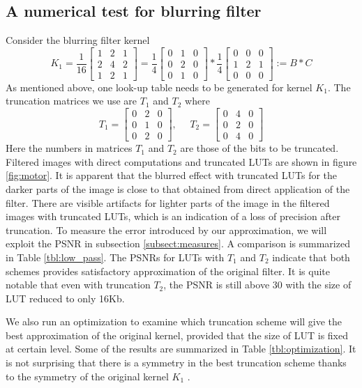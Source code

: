 \documentclass[12pt]{amsart}
\theoremstyle{definition}
\theoremstyle{remark}
\numberwithin{thm}{section}
\begin{document}
\subsection{A numerical test for blurring filter}\label{subsection:numerical_test_lowpass}
Consider the blurring filter kernel 
$$
K_1=\frac{1}{16}
\begin{bmatrix}
1 & 2 & 1\\
2 & 4 & 2\\
1 & 2 & 1
\end{bmatrix}
=
\frac{1}{4}
\begin{bmatrix}
0 & 1 & 0\\
0 & 2 & 0\\
0 & 1 & 0
\end{bmatrix}*\frac{1}{4}
\begin{bmatrix}
0 & 0 & 0\\
1 & 2 & 1\\
0 & 0 & 0
\end{bmatrix}:= B*C
$$
As mentioned above, one look-up table needs to be generated for kernel $K_1$. The truncation matrices we use are $T_1$ and $T_2$ where
$$
T_1=
\begin{bmatrix}
0 & 2 & 0\\
0 & 1 & 0\\
0 & 2 & 0
\end{bmatrix}
,\ \ \ \ \ \ T_2=
\begin{bmatrix}
0 & 4 & 0\\
0 & 2 & 0\\
0 & 4 & 0
\end{bmatrix}
$$
Here the numbers in matrices $T_1$ and $T_2$ are those of the bits to be truncated. Filtered images with direct computations and truncated LUTs are shown in figure \ref{fig:motor}. It is apparent that the blurred effect with truncated LUTs for the darker parts of the image is close to that obtained from direct application of the filter. There are visible artifacts for lighter parts of the image in the filtered images with truncated LUTs, which is an indication of a loss of precision after truncation. To measure the error introduced by our approximation, we will exploit the PSNR in subsection \ref{subsect:measures}. A comparison is summarized in Table \ref{tbl:low_pass}. The PSNRs for LUTs with $T_1$ and $T_2$ indicate that both schemes provides satisfactory approximation of the original filter. It is quite notable that even with truncation $T_2$, the PSNR is still above 30 with the size of LUT reduced to only 16Kb. 

We also run an optimization to examine which truncation scheme will give the best approximation of the original kernel, provided that the size of LUT is fixed at certain level. Some of the results are summarized in Table \ref{tbl:optimization}. It is not surprising that there is a symmetry in the best truncation scheme thanks to the symmetry of the original kernel $K_1$ . 
\end{document}
